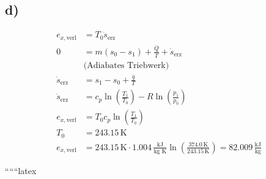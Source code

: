 

\subsection*{d)}

\begin{align*}
    e_{x, \text{verl}} &= T_0 \dot{s}_{\text{erz}} \\
    0 &= m (s_0 - s_1) + \frac{\dot{Q}}{T} + \dot{s}_{\text{erz}} \\
    &\text{(Adiabates Triebwerk)} \\
    \dot{s}_{\text{erz}} &= s_1 - s_0 + \frac{\dot{q}}{T} \\
    \dot{s}_{\text{erz}} &= c_p \ln \left( \frac{T_1}{T_0} \right) - R \ln \left( \frac{p_1}{p_0} \right) \\
    e_{x, \text{verl}} &= T_0 c_p \ln \left( \frac{T_1}{T_0} \right) \\
    T_0 &= 243.15 \, \text{K} \\
    e_{x, \text{verl}} &= 243.15 \, \text{K} \cdot 1.004 \, \frac{\text{kJ}}{\text{kg K}} \ln \left( \frac{374.0 \, \text{K}}{243.15 \, \text{K}} \right) = 82.009 \, \frac{\text{kJ}}{\text{kg}}
\end{align*}

``````latex